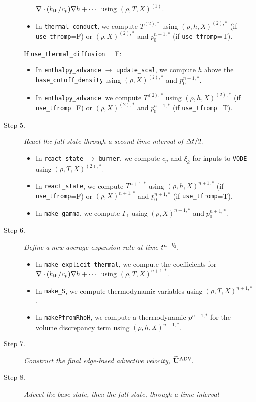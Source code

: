 \begin{description}
\begin{itemize}
$\nabla\cdot(k_{\rm th}/c_p)\nabla h + \cdots$ using $(\rho,T,X)^{(1)}$.
\item In {\tt thermal\_conduct}, we compute $T^{(2),*}$ using $(\rho,h,X)^{(2),*}$
(if {\tt use\_tfromp}=F) or $(\rho,X)^{(2),*}$ and $p_0^{n+1,*}$ (if {\tt use\_tfromp}=T).
\end{itemize}
If {\tt use\_thermal\_diffusion} = F:
\begin{itemize}
\item In {\tt enthalpy\_advance} $\rightarrow$ {\tt update\_scal}, we compute $h$ above
the {\tt base\_cutoff\_density} using $(\rho,X)^{(2),*}$ and $p_0^{n+1,*}$.
\item In {\tt enthalpy\_advance}, we compute $T^{(2),*}$ using $(\rho,h,X)^{(2),*}$
(if {\tt use\_tfromp}=F) or $(\rho,X)^{(2),*}$ and $p_0^{n+1,*}$ (if {\tt use\_tfromp}=T).
\end{itemize}
\item[Step 5.] {\em React the full state through a second time interval of $\Delta t/2.$}
\begin{itemize}
\item In {\tt react\_state} $\rightarrow$ {\tt burner}, we compute $c_p$ and $\xi_k$ 
for inputs to {\tt VODE} using $(\rho,T,X)^{(2),*}$.
\item In {\tt react\_state}, we compute $T^{n+1,*}$ using $(\rho,h,X)^{n+1,*}$ 
(if {\tt use\_tfromp}=F) or $(\rho,X)^{n+1,*}$ and $p_0^{n+1,*}$ (if {\tt use\_tfromp}=T).
\item In {\tt make\_gamma}, we compute $\Gamma_1$ using $(\rho,X)^{n+1,*}$ and $p_0^{n+1,*}$.
\end{itemize}
\item[Step 6.] {\em Define a new average expansion rate at time $t^\nph.$}
\begin{itemize}
\item In {\tt make\_explicit\_thermal}, we compute the coefficients for 
$\nabla\cdot(k_{\rm th}/c_p)\nabla h + \cdots$ using $(\rho,T,X)^{n+1,*}$.
\item In {\tt make\_S}, we compute thermodynamic variables using $(\rho,T,X)^{n+1,*}$.
\item In {\tt makePfromRhoH}, we compute a thermodynamic $p^{n+1,*}$ for the volume 
discrepancy term using $(\rho,h,X)^{n+1,*}$.
\end{itemize}
\item[Step 7.] {\em Construct the final edge-based advective velocity, $\widetilde{\mathbf{U}}^{\mathrm{ADV}}.$}
\item[Step 8.] {\em Advect the base state, then the full state, through a time interval 
}
\end{description}

